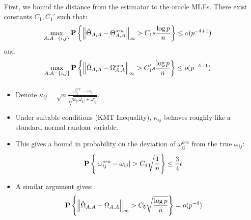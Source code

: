 \begin{frame}[fragile] \frametitle{}

    First, we bound the distance from the estimator to the oracle MLEs.  There
    exist constants $C_1, C_1'$ such that:
    \begin{align*}
        \max_{A:A=\{i, j\}}
        \mathbf{P}\left\{
        \left\lVert\hat\Theta_{A, A} - \Theta_{A, A}^{ora}\right\rVert_\infty
        > C_1 s \frac{\log p}{n}
        \right\}\leq o(p^{-\delta + 1})
    \end{align*}
    and
    \begin{align*}
        \max_{A:A=\{i, j\}}
        \mathbf{P}\left\{
        \left\lVert\hat\Omega_{A, A} - \Omega_{A, A}^{ora}\right\rVert_\infty
        > C_1' s \frac{\log p}{n}
        \right\}\leq o(p^{-\delta + 1})
    \end{align*}
\end{frame}
\begin{frame}[fragile] \frametitle{}

    \begin{itemize}
        \item Denote $\kappa_{ij} = \sqrt{n}\frac{
                \omega_{ij}^{ora} - \omega_{ij}
            }{
                \sqrt{\omega_{ii}\omega_{jj} + \omega_{ij}^2}
            }$.
        \item Under suitable conditions (KMT Inequality), $\kappa_{ij}$ behaves
            roughly like a standard normal random variable.
        \item This gives a bound in probability on the deviation of
            $\omega_{ij}^{ora}$ from the true $\omega_{ij}$:
            $$
                \mathbf{P}\left\{
                |\omega_{ij}^{ora} - \omega_{ij}|
                > C_4 \sqrt{\frac{1}{n}}
                \right\}
                \leq \frac{3}{4}\epsilon
            $$
        \item A similar argument gives:
            $$
                \mathbf{P}\left\{
                    \left\lVert\hat\Omega_{A, A} - \Omega_{A, A}\right\rVert_\infty
                > C_5 \sqrt{\frac{\log p}{n}}
                \right\}
                = o(p^{-\delta})
            $$
    \end{itemize}
\end{frame}
